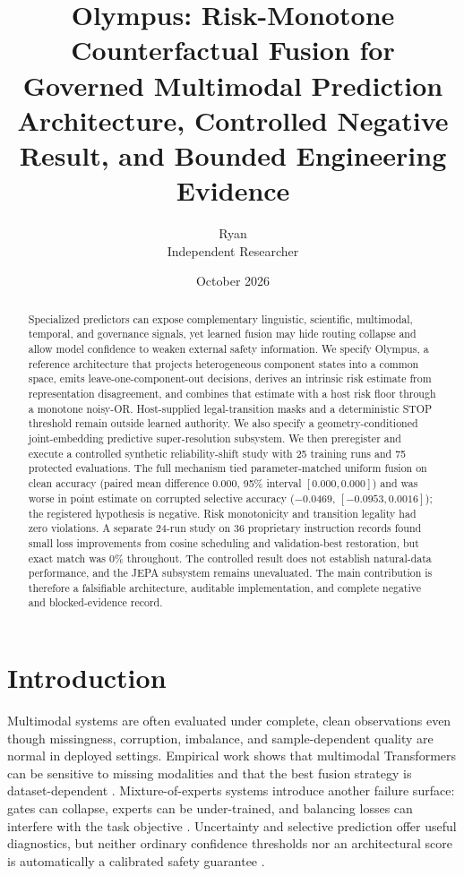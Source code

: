 \documentclass[10pt]{article}
\title{Olympus: Risk-Monotone Counterfactual Fusion for Governed Multimodal Prediction\\\large Architecture, Controlled Negative Result, and Bounded Engineering Evidence}
\author{Ryan\\Independent Researcher}
\date{October 2026}
\begin{document}
\maketitle

\begin{abstract}
Specialized predictors can expose complementary linguistic, scientific, multimodal,
temporal, and governance signals, yet learned fusion may hide routing collapse and allow
model confidence to weaken external safety information. We specify Olympus, a reference
architecture that projects heterogeneous component states into a common space, emits
leave-one-component-out decisions, derives an intrinsic risk estimate from representation
disagreement, and combines that estimate with a host risk floor through a monotone
noisy-OR. Host-supplied legal-transition masks and a deterministic STOP threshold remain
outside learned authority. We also specify a geometry-conditioned joint-embedding
predictive super-resolution subsystem. We then preregister and execute a controlled
synthetic reliability-shift study with 25 training runs and 75 protected evaluations.
The full mechanism tied parameter-matched uniform fusion on clean accuracy (paired mean
difference $0.000$, 95\% interval $[0.000,0.000]$) and was worse in point estimate on
corrupted selective accuracy ($-0.0469$, $[-0.0953,0.0016]$); the registered hypothesis
is negative. Risk monotonicity and transition legality had zero violations. A separate
24-run study on 36 proprietary instruction records found small loss improvements from
cosine scheduling and validation-best restoration, but exact match was 0\% throughout.
The controlled result does not establish natural-data performance, and the JEPA subsystem
remains unevaluated. The main contribution is therefore a falsifiable architecture,
auditable implementation, and complete negative and blocked-evidence record.
\end{abstract}

\section{Introduction}
Multimodal systems are often evaluated under complete, clean observations even though
missingness, corruption, imbalance, and sample-dependent quality are normal in deployed
settings. Empirical work shows that multimodal Transformers can be sensitive to missing
modalities and that the best fusion strategy is dataset-dependent
\cite{ma2022missing,maheshwari2023m3l}. Mixture-of-experts systems introduce another
failure surface: gates can collapse, experts can be under-trained, and balancing losses
can interfere with the task objective \cite{fedus2021switch,zhou2022expertchoice,wang2024lossfree}.
Uncertainty and selective prediction offer useful diagnostics, but neither ordinary
confidence thresholds nor an architectural score is automatically a calibrated safety
guarantee \cite{geifman2019selectivenet,angelopoulos2022crc,lakshminarayanan2016ensembles}.
\end{document}
